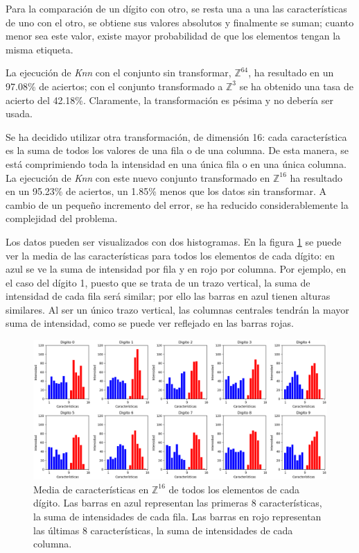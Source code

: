 \documentclass[12pt,spanish]{article} %
\begin{document}
Para la comparación de un dígito con otro, se resta una a una las características de uno con el otro, se obtiene sus valores absolutos y finalmente se suman; cuanto menor sea este valor, existe mayor probabilidad de que los elementos tengan la misma etiqueta.

La ejecución de \textit{Knn} con el conjunto sin transformar, $\mathbb{Z}^{64}$,  ha resultado en un 97.08\% de aciertos; con el conjunto transformado a $\mathbb{Z}^3$ se ha obtenido una tasa de acierto del 42.18\%. Claramente, la transformación es pésima y no debería ser usada.

Se ha decidido utilizar otra transformación, de dimensión 16: cada característica es la suma de todos los valores de una fila o de una columna. De esta manera, se está comprimiendo toda la intensidad en una única fila o en una única columna. La ejecución de \textit{Knn} con este nuevo conjunto transformado en $\mathbb{Z}^{16}$ ha resultado en un 95.23\% de aciertos, un 1.85\% menos que los datos sin transformar. A cambio de un pequeño incremento del error, se ha reducido considerablemente la complejidad del problema.

Los datos pueden ser visualizados con dos histogramas. En la figura \ref{fig:histogramas} se puede ver la media de las características para todos los elementos de cada dígito: en azul se ve la suma de intensidad por fila y en rojo por columna. Por ejemplo, en el caso del dígito 1, puesto que se trata de un trazo vertical, la suma de intensidad de cada fila será similar; por ello las barras en azul tienen alturas similares. Al ser un único trazo vertical, las columnas centrales tendrán la mayor suma de intensidad, como se puede ver reflejado en las barras rojas.

\begin{figure}[H]
  \begin{center}
  \includegraphics[scale=.46]{histogramas}
  \caption{Media de características en $\mathbb{Z}^{16}$ de todos los elementos de cada dígito. Las barras en azul representan las primeras 8 características, la suma de intensidades de cada fila. Las barras en rojo representan las últimas 8 características, la suma de intensidades de cada columna.}
  \label{fig:histogramas}
  \end{center}
\end{figure}
\end{document}
